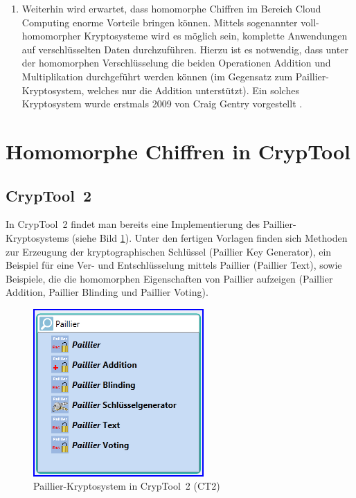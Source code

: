 \begin{refsegment}
\begin{enumerate}
\item Weiterhin wird erwartet, dass homomorphe Chiffren im Bereich Cloud Computing enorme Vorteile bringen können. Mittels sogenannter voll-homomorpher Kryptosysteme \cite{Wiki_HomEnc} wird es möglich sein, komplette Anwendungen auf verschlüsselten Daten durchzuführen. Hierzu ist es notwendig, dass unter der homomorphen Verschlüsselung die beiden Operationen Addition und Multiplikation durchgeführt werden können (im Gegensatz zum Paillier-Kryptosystem, welches nur die Addition unterstützt). Ein solches Kryptosystem wurde erstmals 2009 von Craig Gentry vorgestellt \cite{Gentry2009}.
\end{enumerate}

\section{Homomorphe Chiffren in CrypTool}

\subsection{CrypTool~2}
In CrypTool~2 findet man bereits eine Implementierung des Paillier-Kryptosystems (siehe Bild \ref{CT2-Paillier}). Unter den fertigen Vorlagen finden sich Methoden zur Erzeugung der kryptographischen Schlüssel (Paillier Key Generator), ein Beispiel für eine Ver- und Entschlüsselung mittels Paillier (Paillier Text), sowie Beispiele, die die homomorphen Eigenschaften von Paillier aufzeigen (Paillier Addition, Paillier Blinding und Paillier Voting).

\begin{figure}[ht]
\begin{center}
\includegraphics[scale=0.8]{figures/CT2-Paillier.png}
\caption{Paillier-Kryptosystem in CrypTool~2 (CT2)}
\label{CT2-Paillier}
\end{center}
\end{figure}


\end{refsegment}
